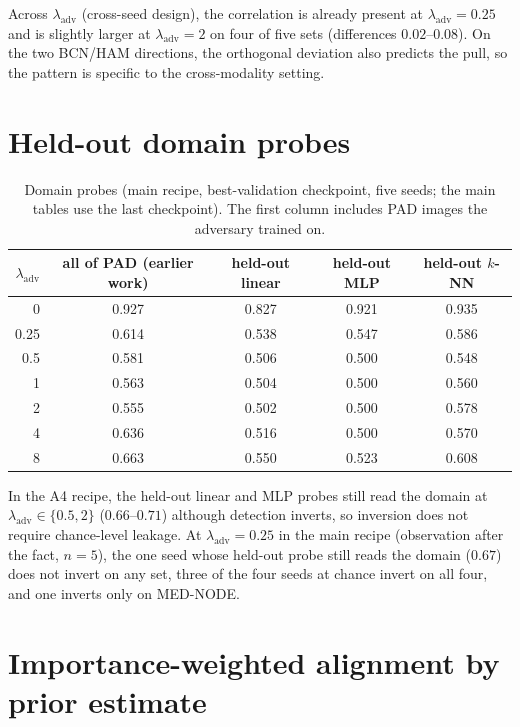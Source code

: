 \documentclass{midl}
\newcommand{\lam}{\lambda_{\mathrm{adv}}}
\begin{document}
Across $\lam$ (cross-seed design), the correlation is already present at $\lam=0.25$ and is
slightly larger at $\lam=2$ on four of five sets (differences $0.02$--$0.08$). On the two
BCN/HAM directions, the orthogonal deviation also predicts the pull, so the pattern is
specific to the cross-modality setting.

\FloatBarrier
\section{Held-out domain probes}
\label{app:probes}

\begin{table}[h]
\centering
\caption{Domain probes (main recipe, best-validation checkpoint, five seeds; the main tables use the last checkpoint). The first column
includes PAD images the adversary trained on.}
\label{tab:probesfull}
\begin{tabular}{rcccc}
\toprule
$\lam$ & all of PAD (earlier work) & held-out linear & held-out MLP & held-out $k$-NN \\
\midrule
0 & 0.927 & 0.827 & 0.921 & 0.935 \\
0.25 & 0.614 & 0.538 & 0.547 & 0.586 \\
0.5 & 0.581 & 0.506 & 0.500 & 0.548 \\
1 & 0.563 & 0.504 & 0.500 & 0.560 \\
2 & 0.555 & 0.502 & 0.500 & 0.578 \\
4 & 0.636 & 0.516 & 0.500 & 0.570 \\
8 & 0.663 & 0.550 & 0.523 & 0.608 \\
\bottomrule
\end{tabular}
\end{table}

In the A4 recipe, the held-out linear and MLP probes still read the domain at $\lam\in\{0.5,2\}$
($0.66$--$0.71$) although detection inverts, so inversion does not require chance-level
leakage. At $\lam=0.25$ in the main recipe (observation after the fact, $n=5$), the one seed
whose held-out probe still reads the domain ($0.67$) does not invert on any set, three of the
four seeds at chance invert on all four, and one inverts only on MED-NODE.

\FloatBarrier
\section{Importance-weighted alignment by prior estimate}
\label{app:prior}
\end{document}
